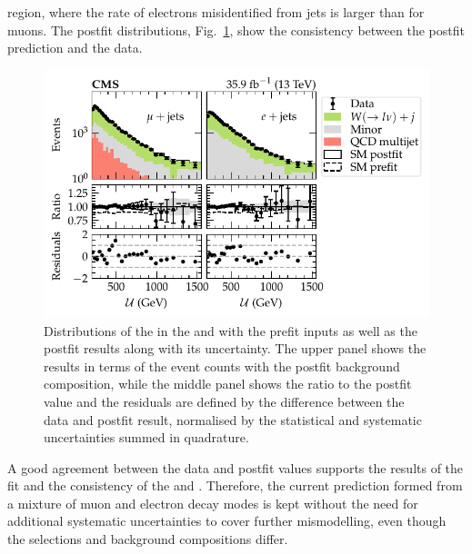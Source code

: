 \eleplusjets region, where the rate of electrons misidentified from jets is
larger than for muons. The postfit distributions,
Fig.~\ref{fig:fit_tf_mu_e_wj_postfit}, show the consistency between the
postfit prediction and the data.
%
\begin{figure}[htb]
    \centering
    \includegraphics{chapters/042_backgrounds/images/postfit_tfmu2ewj.pdf}
    \caption[Recoil distributions in the muon and electron control regions after applying the transfer factors]{
        Distributions of the \recoil in the \muplusjets and \eleplusjets with the prefit inputs as well as the postfit results along with its uncertainty. The upper panel shows the results in terms of the event counts with the postfit background composition, while the middle panel shows the ratio to the postfit value and the residuals are defined by the difference between the data and postfit result, normalised by the statistical and systematic uncertainties summed in quadrature.
    }
    \label{fig:fit_tf_mu_e_wj_postfit}
\end{figure}
%
A good agreement between the data and postfit values supports the results of
the fit and the consistency of the \muplusjets and \eleplusjets. Therefore,
the current \IWj prediction formed from a mixture of muon and electron decay
modes is kept without the need for additional systematic uncertainties to
cover further mismodelling, even though the selections and background
compositions differ.

